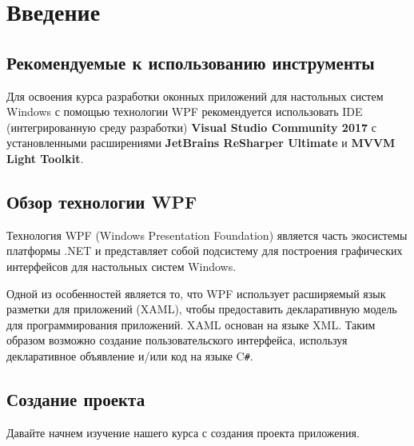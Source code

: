 \section{Введение}

\graphicspath{{parts/guides/1_introduction/images/}}

\subsection{Рекомендуемые к использованию инструменты}

Для освоения курса разработки оконных приложений для настольных систем Windows с помощью технологии WPF рекомендуется использовать IDE (интегрированную среду разработки) \textbf{Visual Studio Community 2017} с установленными расширениями \textbf{JetBrains ReSharper Ultimate} и \textbf{MVVM Light Toolkit}.

\subsection{Обзор технологии WPF}

Технология WPF (Windows Presentation Foundation) является часть экосистемы платформы .NET и представляет собой подсистему для построения графических интерфейсов для настольных систем Windows.

Одной из особенностей является то, что WPF использует расширяемый язык разметки для приложений (XAML), чтобы предоставить декларативную модель для программирования приложений. XAML основан на языке XML. Таким образом возможно создание пользовательского интерфейса, используя декларативное объявление и/или код на языке C\texttt{\#}.


\newpage
\subsection{Создание проекта}
Давайте начнем изучение нашего курса с создания проекта приложения.

